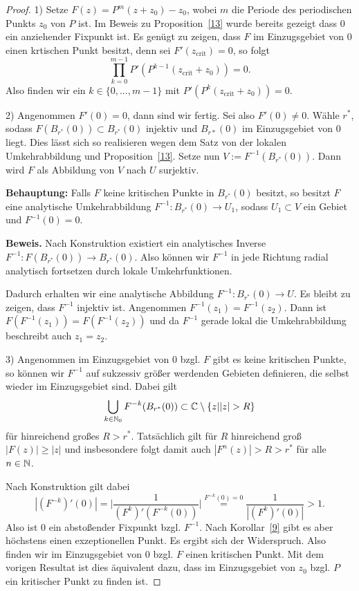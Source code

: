 \documentclass{mywork}
\begin{document}
\begin{proof}
1) Setze $F(z)=P^m(z+z_0)-z_0$, wobei $m$ die Periode des periodischen Punkts $z_0$ von $P$ ist. Im Beweis zu Proposition~\ref{13} wurde bereits gezeigt dass $0$ ein anziehender Fixpunkt ist.  Es genügt zu zeigen, dass $F$ im Einzugsgebiet von $0$ einen krtischen Punkt besitzt, denn sei $F'(z_{\mathrm{crit}})=0$, so folgt
\[
	\prod_{k=0}^{m-1} P'(P^{k-1}(z_{\mathrm{crit}}+z_0))=0.
\]
Also finden wir ein $k\in \{0,...,m-1\}$ mit $P'(P^k(z_{\mathrm{crit}}+z_0))=0$.

2) Angenommen $F'(0)=0$, dann sind wir fertig. Sei also $F'(0)\neq 0$. Wähle $r^*$, sodass $F(B_{r^*}(0))\subset B_{r^*}(0)$ injektiv und $B_{r*}(0)$ im Einzugsgebiet von $0$ liegt. Dies lässt sich so realisieren wegen dem Satz von der lokalen Umkehrabbildung und Proposition~\ref{13}. Setze nun $V:=F^{-1}(B_{r^*}(0))$. Dann wird $F$ als Abbildung von $V$ nach $U$ surjektiv.

\textbf{Behauptung:} Falls $F$ keine kritischen Punkte in $B_{r^*}(0)$ besitzt, so besitzt $F$ eine analytische Umkehrabbildung $F^{-1}: B_{r^*}(0) \to U_1$, sodass $U_1\subset V$ ein Gebiet und $F^{-1}(0)=0$.

\textbf{Beweis.} Nach Konstruktion existiert ein analytisches Inverse $F^{-1}: F(B_{r^*}(0)) \to B_{r^*}(0)$. Also können wir $F^{-1}$ in jede Richtung radial analytisch fortsetzen durch lokale Umkehrfunktionen. 


Dadurch erhalten wir eine analytische Abbildung $F^{-1}: B_{r^*}(0) \to U$. Es bleibt zu zeigen, dass $F^{-1}$ injektiv ist. Angenommen $F^{-1}(z_1)=F^{-1}(z_2)$. Dann ist $F(F^{-1}(z_1))=F(F^{-1}(z_2))$ und da $F^{-1}$ gerade lokal die Umkehrabbildung beschreibt auch $z_1=z_2$.

3) Angenommen im Einzugsgebiet von $0$ bzgl. $F$ gibt es keine kritischen Punkte, so können wir $F^{-1}$ auf sukzessiv größer werdenden Gebieten definieren, die selbst wieder im Einzugsgebiet sind. Dabei gilt
\[
\bigcup_{k\in \N_0} F^{-k}(B_{r^*}(0))\subset \C\setminus \{z| |z|>R\}
\] 
für hinreichend großes $R>r^*$. Tatsächlich gilt für $R$  hinreichend groß $|F(z)| \ge |z|$ und insbesondere folgt damit auch $|F^n(z)|>R>r^*$ für alle $n\in \mathbb{N}$. 

Nach Konstruktion gilt dabei 
\[
|(F^{-k})'(0)|=\Bigg|\frac{1}{(F^k)'(F^{-k}(0))} \Bigg|\stackrel{F^{-k}(0)=0}= \frac{1}{|(F^k)'(0)|}>1.
\]
Also ist $0$ ein abstoßender Fixpunkt bzgl. $F^{-1}$. Nach Korollar~\ref{9} gibt es aber höchstens einen exzeptionellen Punkt. Es ergibt sich der Widerspruch. Also finden wir im Einzugsgebiet von $0$ bzgl. $F$ einen kritischen Punkt. Mit dem vorigen Resultat ist dies äquivalent dazu, dass im Einzugsgebiet von $z_0$ bzgl. $P$ ein kritischer Punkt zu finden ist.

\end{proof}
\end{document}
